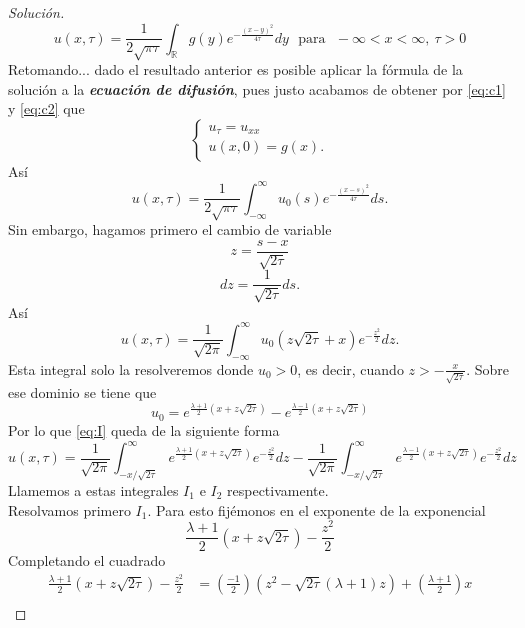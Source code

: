 \documentclass[11pt,notitlepage]{article}
\newenvironment{solucion}
  {\begin{proof}[Solución]}
  {\end{proof}}
\begin{document}
\begin{solucion}
    \begin{equation*}
        u(x,\tau) = \frac{1}{2\sqrt{\pi \tau}}\int_{\mathbb{R}} g(y) e^{-\frac{(x-y)^2}{4\tau}} dy \ \ \ \mbox{para} \ \ \ -\infty < x < \infty, \ \tau > 0 
    \end{equation*}
     Retomando... dado el resultado anterior es posible aplicar la fórmula de la solución a la \textbf{\textit{ecuación de difusión}}, pues justo acabamos de obtener por \eqref{eq:c1} y \eqref{eq:c2} que
    \begin{equation*}
    \begin{cases}
        u_\tau = u_{xx}\\
        u(x,0) = g(x).
    \end{cases}
    \end{equation*}    
    Así
    \begin{equation}
        \label{eq:hf}
        u(x,\tau) = \frac{1}{2\sqrt{\pi \tau}}\int_{-\infty}^\infty u_0(s) e^{-\frac{(x-s)^2}{4\tau}} ds.
    \end{equation}
    Sin embargo, hagamos primero el cambio de variable 
    $$ z = \frac{s-x}{\sqrt{2 \tau}} $$
    $$ dz = \frac{1}{\sqrt{2 \tau}} ds. $$
    Así
    \begin{equation}
        \label{eq:I}
        u(x,\tau) = \frac{1}{\sqrt{2 \pi}} \int_{-\infty}^{\infty} u_0 \left( z\sqrt{2\tau} + x \right) e^{-\frac{z^2}{2}} dz.
    \end{equation}
    Esta integral solo la resolveremos donde $u_0 > 0$, es decir, cuando $z > -\frac{x}{\sqrt{2\tau}}$. Sobre ese dominio se tiene que
    $$u_0 = e^{\frac{\lambda + 1}{2} ( x + z\sqrt{2 \tau})} - e^{\frac{\lambda - 1}{2} ( x + z\sqrt{2 \tau})} $$
    Por lo que \eqref{eq:I} queda de la siguiente forma
    \begin{equation*}
        u(x, \tau) = \frac{1}{\sqrt{2 \pi}} \int_{-x/\sqrt{2 \tau}}^{\infty} e^{\frac{\lambda + 1}{2} ( x + z\sqrt{2 \tau})} e^{-\frac{z^2}{2}} dz - \frac{1}{\sqrt{2 \pi}} \int_{-x/\sqrt{2 \tau}}^{\infty} e^{\frac{\lambda - 1}{2} ( x + z\sqrt{2 \tau})} e^{-\frac{z^2}{2}} dz
    \end{equation*}
    Llamemos a estas integrales $I_1$ e $I_2$ respectivamente.\\
    Resolvamos primero $I_1$. Para esto fijémonos en el exponente de la exponencial
    $$ \frac{\lambda + 1}{2} ( x + z\sqrt{2 \tau}) - \frac{z^2}{2} $$
    Completando el cuadrado
    \begin{align*}
        \frac{\lambda + 1}{2} ( x + z\sqrt{2 \tau}) - \frac{z^2}{2} &= \left(\frac{-1}{2} \right) \left( z^2 - \sqrt{2\tau} (\lambda + 1) z \right) + \left(\frac{\lambda +1 }{2} \right) x\\

\end{align*}
\end{solucion}
\end{document}
